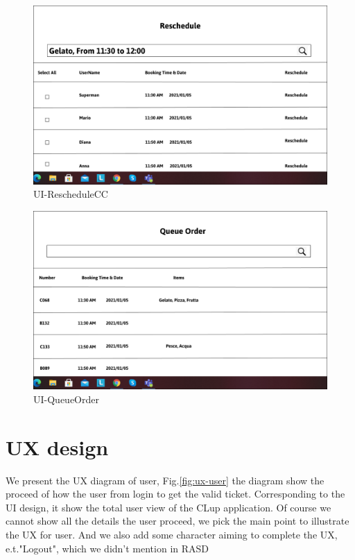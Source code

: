 \documentclass[a4paper,12pt]{report}
\begin{document}
\begin{figure}[H]
	\centering
	\includegraphics[scale=0.4]{UI-RescheduleCC.png}
	\caption{UI-RescheduleCC}
	\centering
	\label{fig:UI-RescheduleCC}
\end{figure}

\begin{figure}[H]
	\centering
	\includegraphics[scale=0.4]{UI-QueueOrder.png}
	\caption{UI-QueueOrder}
	\centering
	\label{fig:UI-QueueOrder}
\end{figure}


\section{UX design}
We present the UX diagram of user, Fig.\ref{fig:ux-user} the diagram show the proceed of how the user from login to get the valid ticket. Corresponding to the UI design, it show the total user view of the CLup application. Of course we cannot show all the details the user proceed, we pick the main point to illustrate the UX for user. And we also add some character aiming to complete the UX, e.t."Logout", which we didn't mention in RASD~\\
\end{document}
